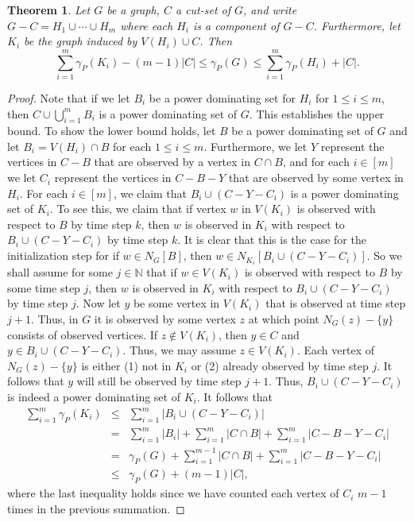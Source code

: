 \documentclass[11pt]{article}
\newcommand{\abs}[1]{\left\vert#1\right\vert}
\newtheorem{theorem}{Theorem}
\begin{document}
\begin{theorem}\label{thm:lowercut}
Let $G$ be a graph, $C$ a cut-set of $G$, and write $G-C = H_1 \cup \cdots \cup H_m$ where each $H_i$ is a component of $G-C$. Furthermore, let $K_i$ be the graph induced by $V(H_i) \cup C$.  Then
\[\sum_{i=1}^m\gamma_P(K_i)-(m-1)\abs{C} \leq \gamma_P(G) \leq \sum_{i=1}^m\gamma_P(H_i)+\abs{C}.\]
\end{theorem}

\begin{proof}
Note that if we let $B_i$ be a power dominating set for $H_i$ for $1 \le i \le m$, then $C \cup \bigcup_{i=1}^m B_i$ is a power dominating set of $G$. This establishes the upper bound. To show the lower bound holds, let $B$ be a power dominating set of $G$ and let $B_i = V(H_i)\cap B$ for each $1 \le i \le m$. Furthermore, we let $Y$ represent the vertices in $C-B$ that are observed by a vertex in $C\cap B$, and for each $i \in [m]$ we let $C_i$ represent the vertices in $C-B - Y$ that are observed by some vertex in $H_i$. For each $i\in [m]$, we claim that $B_i \cup (C- Y - C_i)$ is a power dominating set of $K_i$. To see this, we claim that if vertex $w$ in $V(K_i)$ is observed with respect to $B$ by time step $k$, then $w$ is observed in $K_i$ with respect to $B_i \cup (C - Y - C_i)$ by time step $k$. It is clear that this is the case for the initialization step for if $w \in N_G[B]$, then $w \in N_{K_i}[B_i \cup (C - Y - C_i)]$. So we shall assume for some $j \in \mathbb{N}$ that if $w \in V(K_i)$ is observed with respect to $B$ by some time step $j$, then $w$ is observed in $K_i$ with respect to $B_i \cup (C - Y - C_i)$ by time step $j$. Now let $y$ be some vertex in $ V(K_i)$ that is observed at time step $j+1$. Thus, in $G$ it is observed by some vertex $z$ at which point $N_G(z) - \{y\}$ consists of observed vertices. If $z \not\in V(K_i)$, then $y \in C$ and $y \in B_i \cup (C - Y - C_i)$. Thus, we may assume $z \in V(K_i)$. Each vertex of $N_G(z) - \{y\}$ is either (1) not in $K_i$ or (2) already observed by time step $j$. It follows that $y$ will still be observed by time step $j+1$. Thus, $B_i \cup (C - Y - C_i)$ is indeed a power dominating set of $K_i$. It follows that 
\begin{eqnarray*}
\sum_{i=1}^m\gamma_P(K_i) &\le& \sum_{i=1}^m|B_i \cup (C - Y - C_i)|\\
&=& \sum_{i=1}^m|B_i| + \sum_{i=1}^m|C \cap B| + \sum_{i=1}^m|C-B-Y - C_i|\\
&=& \gamma_P(G) + \sum_{i=1}^{m-1}|C\cap B| + \sum_{i=1}^m |C-B-Y - C_i|\\
&\le& \gamma_P(G) + (m-1)|C|,
\end{eqnarray*}
where the last inequality holds since we have counted each vertex of $C_i$ $m-1$ times in the previous summation. 

\end{proof}
\end{document}
